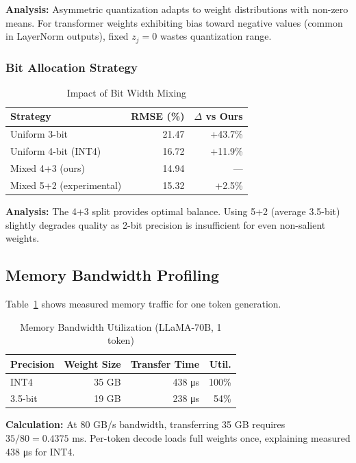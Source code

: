 \documentclass[10pt]{article}
\begin{document}
\textbf{Analysis:} Asymmetric quantization adapts to weight distributions with non-zero means. For transformer weights exhibiting bias toward negative values (common in LayerNorm outputs), fixed $z_j = 0$ wastes quantization range.

\subsubsection{Bit Allocation Strategy}

\begin{table}[h]
\centering
\caption{Impact of Bit Width Mixing}
\begin{tabular}{lrr}
\toprule
\textbf{Strategy} & \textbf{RMSE (\%)} & \textbf{$\Delta$ vs Ours} \\
\midrule
Uniform 3-bit                  & 21.47 & +43.7\% \\
Uniform 4-bit (INT4)           & 16.72 & +11.9\% \\
Mixed 4+3 (ours)               & 14.94 & ---     \\
Mixed 5+2 (experimental)       & 15.32 & +2.5\%  \\
\bottomrule
\end{tabular}
\end{table}

\textbf{Analysis:} The 4+3 split provides optimal balance. Using 5+2 (average 3.5-bit) slightly degrades quality as 2-bit precision is insufficient for even non-salient weights.

\subsection{Memory Bandwidth Profiling}

Table~\ref{tab:bandwidth} shows measured memory traffic for one token generation.

\begin{table}[h]
\centering
\caption{Memory Bandwidth Utilization (LLaMA-70B, 1 token)}
\label{tab:bandwidth}
\begin{tabular}{lrrr}
\toprule
\textbf{Precision} & \textbf{Weight Size} & \textbf{Transfer Time} & \textbf{Util.} \\
\midrule
INT4       & 35 GB  & 438 μs & 100\% \\
3.5-bit    & 19 GB  & 238 μs & 54\% \\
\bottomrule
\end{tabular}
\end{table}

\textbf{Calculation:} At 80 GB/s bandwidth, transferring 35 GB requires $35/80 = 0.4375$ ms. Per-token decode loads full weights once, explaining measured 438 μs for INT4.
\end{document}
